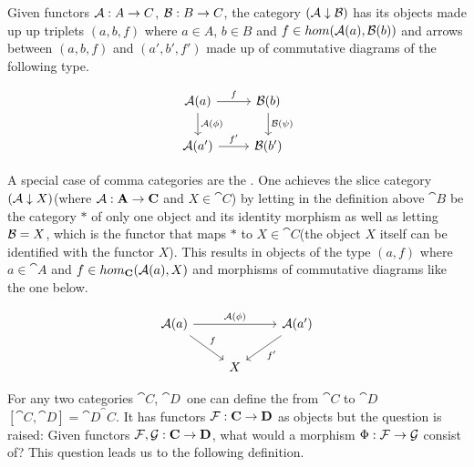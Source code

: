\documentclass[../../main.tex]{subfiles}
\begin{document}
    \begin{definition}
        Given functors $\mathcal{A}: A \to C$, $\mathcal{B}: B \to C$, the category $(\mathcal{A} \downarrow \mathcal{B})$ has its objects made up up triplets $(a, b, f)$ where $a \in A$, $b \in B$ and $f \in hom(\mathcal{A}(a), \mathcal{B}(b))$ and arrows between $(a, b, f)$ and $(a', b', f')$ made up of commutative diagrams of the following type.
    \end{definition}

    \begin{figure}[H]
        \[
            \begin{tikzcd}
                \functor{A}(a) \arrow[r, "f"] \arrow[d, "\functor{A}(\phi)"]
                & \functor{B}(b) \arrow[d, "\functor{B}(\psi)"] \\
                \functor{A}(a') \arrow[r, "f'"]
                & \functor{B}(b')
            \end{tikzcd}
        \]
    \end{figure}

    A special case of comma categories are the . One achieves the slice category $(\mathcal{A} \downarrow X)$(where $\mathcal{A}: \mathbf{A} \to \mathbf{C}$ and $X \in \cat{C}$) by letting in the definition above $\cat{B}$ be the category $*$ of only one object and its identity morphism as well as letting $\mathcal{B}=X$, which is the functor that maps $*$ to $X \in \cat{C}$(the object $X$ itself can be identified with the functor $X$). This results in objects of the type $(a, f)$ where $a \in \cat{A}$ and $f \in hom_\mathbf{C}(\mathcal{A}(a), X)$ and morphisms of commutative diagrams like the one below.

    \begin{figure}[H]
        \[
            \begin{tikzcd}
                \functor{A}(a) \arrow{dr}{f} \arrow{rr}{\functor{A}(\phi)} && \functor{A}(a') \arrow{dl}{f'}\\
                & X
            \end{tikzcd}
        \]
    \end{figure}

    For any two categories $\cat{C}$, $\cat{D}$ one can define the  from $\cat{C}$ to $\cat{D}$ $[\cat{C}, \cat{D}] = \cat{D}^\cat{C}$. It has functors $\mathcal{F}: \mathbf{C} \to \mathbf{D}$ as objects but the question is raised: Given functors $\mathcal{F}, \mathcal{G}: \mathbf{C} \to \mathbf{D}$, what would a morphism $\Phi: \mathcal{F} \to \mathcal{G}$ consist of? This question leads us to the following definition.
\end{document}
